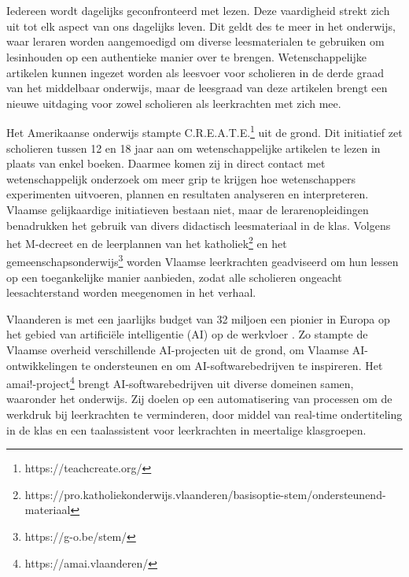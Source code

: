 
\chapter{}%
\label{ch:inleiding}

Iedereen wordt dagelijks geconfronteerd met lezen. Deze vaardigheid strekt zich uit tot elk aspect van ons dagelijks leven. Dit geldt des te meer in het onderwijs, waar leraren worden aangemoedigd om diverse leesmaterialen te gebruiken om lesinhouden op een authentieke manier over te brengen. Wetenschappelijke artikelen kunnen ingezet worden als leesvoer voor scholieren in de derde graad van het middelbaar onderwijs, maar de leesgraad van deze artikelen brengt een nieuwe uitdaging voor zowel scholieren als leerkrachten met zich mee. 

\medspace

Het Amerikaanse onderwijs stampte C.R.E.A.T.E.\footnote{https://teachcreate.org/} uit de grond. Dit initiatief zet scholieren tussen 12 en 18 jaar aan om wetenschappelijke artikelen te lezen in plaats van enkel boeken. Daarmee komen zij in direct contact met wetenschappelijk onderzoek om meer grip te krijgen hoe wetenschappers experimenten uitvoeren, plannen en resultaten analyseren en interpreteren. Vlaamse gelijkaardige initiatieven bestaan niet, maar de lerarenopleidingen benadrukken het gebruik van divers didactisch leesmateriaal in de klas. Volgens het M-decreet en de leerplannen van het katholiek\footnote{https://pro.katholiekonderwijs.vlaanderen/basisoptie-stem/ondersteunend-materiaal} en het gemeenschapsonderwijs\footnote{https://g-o.be/stem/} worden Vlaamse leerkrachten geadviseerd om hun lessen op een toegankelijke manier aanbieden, zodat alle scholieren ongeacht leesachterstand worden meegenomen in het verhaal. 

\medspace

Vlaanderen is met een jaarlijks budget van 32 miljoen een pionier in Europa op het gebied van artificiële intelligentie (AI) op de werkvloer \autocite{Crevits2022}. Zo stampte de Vlaamse overheid verschillende AI-projecten uit de grond, om Vlaamse AI-ontwikkelingen te ondersteunen en om AI-softwarebedrijven te inspireren. Het amai!-project\footnote{https://amai.vlaanderen/} brengt AI-softwarebedrijven uit diverse domeinen samen, waaronder het onderwijs. Zij doelen op een automatisering van processen om de werkdruk bij leerkrachten te verminderen, door middel van real-time ondertiteling in de klas en een taalassistent voor leerkrachten in meertalige klasgroepen.


